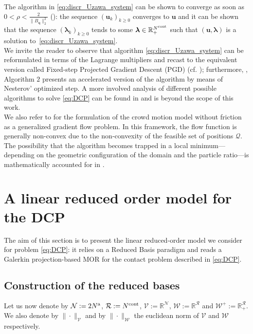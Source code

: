 \medskip

The algorithm in \eqref{eq:discr_Uzawa_system} can be shown to converge as soon as $0<\rho<\frac{2}{\|B_{\mathbf{q}}\|_2^2}$ (\cite{ciarlet1982introduction}): the sequence $(\mathbf{u}_{k})_{k\geq 0}$  converges to $\mathbf{u}$ and it can be shown that the sequence $(\boldsymbol{\lambda}_k)_{k\geq 0}$ tends to some $\boldsymbol{\lambda}\in \mathbb{R}_{+}^{N^{\rm cont}}$ such that $(\mathbf{u}, \boldsymbol{\lambda})$ is a solution to~\eqref{eq:discr_Uzawa_system}.\\

	We invite the reader to observe that algorithm \eqref{eq:discr_Uzawa_system} can be reformulated in terms of the Lagrange multipliers and recast to the equivalent version called Fixed-step Projected Gradient Descent (PGD) (cf. \cite[Algorithm $1$]{bloch2023convex}); furthermore, \cite{bloch2023convex}, Algorithm $2$ presents an accelerated version of the algorithm by means of Nesterov’ optimized step. A more involved analysis of different possible algorithms to solve \eqref{eq:DCP} can be found in \cite{bloch2023convex} and is beyond the scope of this work.\\
	We also refer to \cite{faure2015crowd} for the formulation of the crowd motion model without friction as a generalized gradient flow problem. In this framework, the flow function is generally non-convex due to the non-convexity of the feasible set of positions $\mathcal{Q}$. The possibility that the algorithm becomes trapped in a local minimum—depending on the geometric configuration of the domain and the particle ratio—is mathematically accounted for in \cite{faure2015crowd}.


\section{A linear reduced order model for the DCP}
\label{sec:RB}
The aim of this section is to present the linear reduced-order model we consider for problem \eqref{eq:DCP}: it relies on a Reduced Basis paradigm and reads a Galerkin projection-based MOR for the contact problem described in \eqref{eq:DCP}.
\subsection{Construction of the reduced bases}
\label{sec:RB_constr}

Let us now denote by $\mathcal N:= 2N^{\rm a}$, $\mathcal R:= N^{\rm cont}$, $\mathcal{V}:= \mathbb{R}^{\mathcal N}$, $\mathcal W:= \mathbb{R}^{\mathcal R}$ and $\mathcal W^+:= \mathbb{R}_+^{\mathcal R}$. We also denote by $\|\cdot\|_{\mathcal V}$ and by $\|\cdot\|_{\mathcal W}$ the euclidean norm of $\mathcal V$ and $\mathcal W$ respectively. 


